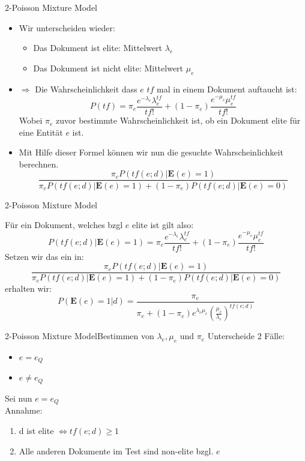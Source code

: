 \documentclass{beamer}
\begin{document}
\begin{frame}{2-Poisson Mixture Model}
\begin{itemize}
\item Wir unterscheiden wieder:
\begin{itemize}
\item Das Dokument ist elite: Mittelwert $\lambda_e$
\item Das Dokument ist nicht elite: Mittelwert $\mu_e$
\end{itemize}
\item $\Rightarrow$ Die Wahrscheinlichkeit dass $e$ $tf$ mal in einem Dokument auftaucht ist:
\[ P(tf) = \pi_e \frac{e^{-\lambda_e}\lambda_e^{tf}}{tf!} + (1-\pi_e)\frac{e^{-\mu_e}\mu_e^{tf}}{tf!}\]
Wobei $\pi_e$ zuvor bestimmte Wahrscheinlichkeit ist, ob ein Dokument elite für eine Entität $e$ ist.\\
\item Mit Hilfe dieser Formel können wir nun die gesuchte Wahrscheinlichkeit berechnen.
\[ \frac{\pi_e P(tf(e;d)|\textbf{E}(e)=1)}{\pi_e P(tf(e;d)|\textbf{E}(e)=1)+(1-\pi_e) P(tf(e;d)|\textbf{E}(e)=0)}\]

\end{itemize}
\end{frame}

\begin{frame}{2-Poisson Mixture Model}

Für ein Dokument, welches bzgl $e$ elite ist gilt also:
\[ P(tf(e;d)|\textbf{E}(e)=1) =  \pi_e \frac{e^{-\lambda_e}\lambda_e^{tf}}{tf!} + (1-\pi_e)\frac{e^{-\mu_e}\mu_e^{tf}}{tf!}\]
Setzen wir das ein in:
\[ \frac{\pi_e P(tf(e;d)|\textbf{E}(e)=1)}{\pi_e P(tf(e;d)|\textbf{E}(e)=1)+(1-\pi_e) P(tf(e;d)|\textbf{E}(e)=0)}\]
erhalten wir:
\[ P(\textbf{E}(e) = 1|d) = \frac{\pi_e}{\pi_e + (1-\pi_e)e^{\lambda_e  \mu_e}\left( \frac{\mu_e}{\lambda_e}\right)^{tf(e;d)}}\]
\end{frame}

\begin{frame}{2-Poisson Mixture Model}{Bestimmen von $\lambda_e,\mu_e$ und $\pi_e$}
Unterscheide 2 Fälle:
\begin{itemize}
\item $e=e_Q$
\item $e \neq e_Q$
\end{itemize}
Sei nun $e=e_Q$\\
Annahme:
\begin{enumerate}
\item d ist elite $\Leftrightarrow tf(e;d) \geq 1$
\item Alle anderen Dokumente im Test sind non-elite bzgl. $e$
\end{enumerate}

\end{frame}
\end{document}
